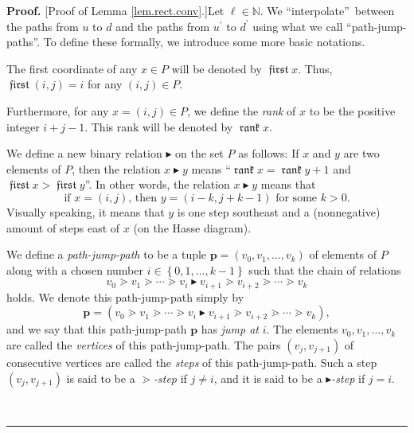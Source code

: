 \documentclass[numbers=enddot,12pt,final,onecolumn,notitlepage]{scrartcl}%
\theoremstyle{definition}
\DeclareMathOperator{\first}{\mathfrak{first}}
\DeclareMathOperator{\rank}{\mathfrak{rank}}
\newenvironment{proof}[1][Proof]{\noindent\textbf{#1.} }{\ \rule{0.5em}{0.5em}}
\begin{document}
\begin{proof}
[Proof of Lemma \ref{lem.rect.conv}.]Let $\ell\in\mathbb{N}$. We
\textquotedblleft interpolate\textquotedblright\ between the paths from $u$ to
$d$ and the paths from $u^{\prime}$ to $d^{\prime}$ using what we call
\textquotedblleft path-jump-paths\textquotedblright. To define these formally,
we introduce some more basic notations.

The first coordinate of any $x\in P$ will be denoted by $\first x$. Thus,
$\first \left(  i,j\right)  =i$ for any $\left(  i,j\right)  \in P$.

Furthermore, for any $x=\left(  i,j\right)  \in P$, we define the \emph{rank}
of $x$ to be the positive integer $i+j-1$. This rank will be denoted by
$\rank x$.

We define a new binary relation $\blacktriangleright$ on the set $P$ as
follows: If $x$ and $y$ are two elements of $P$, then the relation
$x\blacktriangleright y$ means \textquotedblleft$\rank x=\rank y+1$ and
$\first x>\first y$\textquotedblright. In other words, the relation
$x\blacktriangleright y$ means that%
\[
\text{if }x=\left(  i,j\right)  \text{, then }y=\left(  i-k,j+k-1\right)
\text{ for some }k>0.
\]
Visually speaking, it means that $y$ is one step southeast and a (nonnegative)
amount of steps east of $x$ (on the Hasse diagram).

We define a \emph{path-jump-path} to be a tuple $\mathbf{p}=\left(
v_{0},v_{1},\ldots,v_{k}\right)  $ of elements of $P$ along with a chosen
number $i\in\left\{  0,1,\ldots,k-1\right\}  $ such that the chain of
relations%
\[
v_{0}\gtrdot v_{1}\gtrdot\cdots\gtrdot v_{i}\blacktriangleright v_{i+1}\gtrdot
v_{i+2}\gtrdot\cdots\gtrdot v_{k}%
\]
holds. We denote this path-jump-path simply by%
\begin{equation}
\mathbf{p}=\left(  v_{0}\gtrdot v_{1}\gtrdot\cdots\gtrdot v_{i}%
\blacktriangleright v_{i+1}\gtrdot v_{i+2}\gtrdot\cdots\gtrdot v_{k}\right)  ,
\label{eq.lem.rect.conv.pjp}%
\end{equation}
and we say that this path-jump-path $\mathbf{p}$ has \emph{jump at }$i$. The
elements $v_{0},v_{1},\ldots,v_{k}$ are called the \emph{vertices} of this
path-jump-path. The pairs $\left(  v_{j},v_{j+1}\right)  $ of consecutive
vertices are called the \emph{steps} of this path-jump-path. Such a step
$\left(  v_{j},v_{j+1}\right)  $ is said to be a $\gtrdot$\emph{-step} if
$j\neq i$, and it is said to be a $\blacktriangleright$\emph{-step} if $j=i$.


\end{proof}
\end{document}
